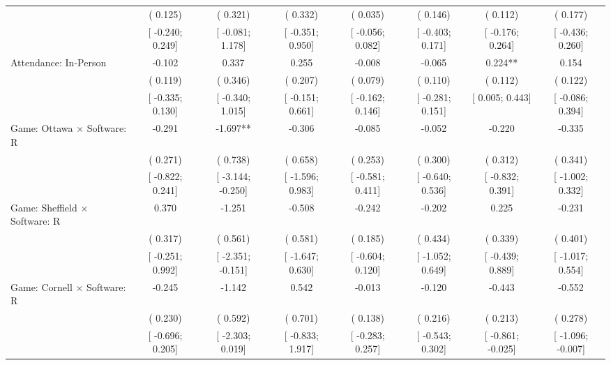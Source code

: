 \begin{tabular}{l*{7}{c}}
                    &(    0.125)   &(    0.321)   &(    0.332)   &(    0.035)   &(    0.146)   &(    0.112)   &(    0.177)   \\
                    &[   -0.240;     0.249]   &[   -0.081;     1.178]   &[   -0.351;     0.950]   &[   -0.056;     0.082]   &[   -0.403;     0.171]   &[   -0.176;     0.264]   &[   -0.436;     0.260]   \\
Attendance: In-Person &   -0.102   &    0.337   &    0.255   &   -0.008   &   -0.065   &    0.224**   &    0.154   \\
                    &(    0.119)   &(    0.346)   &(    0.207)   &(    0.079)   &(    0.110)   &(    0.112)   &(    0.122)   \\
                    &[   -0.335;     0.130]   &[   -0.340;     1.015]   &[   -0.151;     0.661]   &[   -0.162;     0.146]   &[   -0.281;     0.151]   &[    0.005;     0.443]   &[   -0.086;     0.394]   \\
Game: Ottawa $\times$ Software: R &   -0.291   &   -1.697**   &   -0.306   &   -0.085   &   -0.052   &   -0.220   &   -0.335   \\
                    &(    0.271)   &(    0.738)   &(    0.658)   &(    0.253)   &(    0.300)   &(    0.312)   &(    0.341)   \\
                    &[   -0.822;     0.241]   &[   -3.144;    -0.250]   &[   -1.596;     0.983]   &[   -0.581;     0.411]   &[   -0.640;     0.536]   &[   -0.832;     0.391]   &[   -1.002;     0.332]   \\
Game: Sheffield $\times$ Software: R &    0.370   &   -1.251   &   -0.508   &   -0.242   &   -0.202   &    0.225   &   -0.231   \\
                    &(    0.317)   &(    0.561)   &(    0.581)   &(    0.185)   &(    0.434)   &(    0.339)   &(    0.401)   \\
                    &[   -0.251;     0.992]   &[   -2.351;    -0.151]   &[   -1.647;     0.630]   &[   -0.604;     0.120]   &[   -1.052;     0.649]   &[   -0.439;     0.889]   &[   -1.017;     0.554]   \\
Game: Cornell $\times$ Software: R &   -0.245   &   -1.142   &    0.542   &   -0.013   &   -0.120   &   -0.443   &   -0.552   \\
                    &(    0.230)   &(    0.592)   &(    0.701)   &(    0.138)   &(    0.216)   &(    0.213)   &(    0.278)   \\
                    &[   -0.696;     0.205]   &[   -2.303;     0.019]   &[   -0.833;     1.917]   &[   -0.283;     0.257]   &[   -0.543;     0.302]   &[   -0.861;    -0.025]   &[   -1.096;    -0.007]   \\

\end{tabular}
